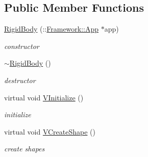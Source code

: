 \subsection*{Public Member Functions}
\begin{DoxyCompactItemize}
\item 
\hypertarget{classContent_1_1Actor_1_1RigidBody_a0c70e1870807e239677317e873850d36}{
\hyperlink{classContent_1_1Actor_1_1RigidBody_a0c70e1870807e239677317e873850d36}{RigidBody} (::\hyperlink{classFramework_1_1App}{Framework::App} $\ast$app)}
\label{classContent_1_1Actor_1_1RigidBody_a0c70e1870807e239677317e873850d36}

\begin{DoxyCompactList}\small\item\em constructor \item\end{DoxyCompactList}\item 
\hypertarget{classContent_1_1Actor_1_1RigidBody_a87dbf4cbbbb98ae56bd254c21d9b342e}{
\hyperlink{classContent_1_1Actor_1_1RigidBody_a87dbf4cbbbb98ae56bd254c21d9b342e}{$\sim$RigidBody} ()}
\label{classContent_1_1Actor_1_1RigidBody_a87dbf4cbbbb98ae56bd254c21d9b342e}

\begin{DoxyCompactList}\small\item\em destructor \item\end{DoxyCompactList}\item 
\hypertarget{classContent_1_1Actor_1_1RigidBody_a4494c0e95904680e76bae86bcfa0ce41}{
virtual void \hyperlink{classContent_1_1Actor_1_1RigidBody_a4494c0e95904680e76bae86bcfa0ce41}{VInitialize} ()}
\label{classContent_1_1Actor_1_1RigidBody_a4494c0e95904680e76bae86bcfa0ce41}

\begin{DoxyCompactList}\small\item\em initialize \item\end{DoxyCompactList}\item 
\hypertarget{classContent_1_1Actor_1_1RigidBody_a8f1e4a5df48fb52d621bf683a0c9fc19}{
virtual void \hyperlink{classContent_1_1Actor_1_1RigidBody_a8f1e4a5df48fb52d621bf683a0c9fc19}{VCreateShape} ()}
\label{classContent_1_1Actor_1_1RigidBody_a8f1e4a5df48fb52d621bf683a0c9fc19}

\begin{DoxyCompactList}\small\item\em create shapes \item\end{DoxyCompactList}\end{DoxyCompactItemize}
